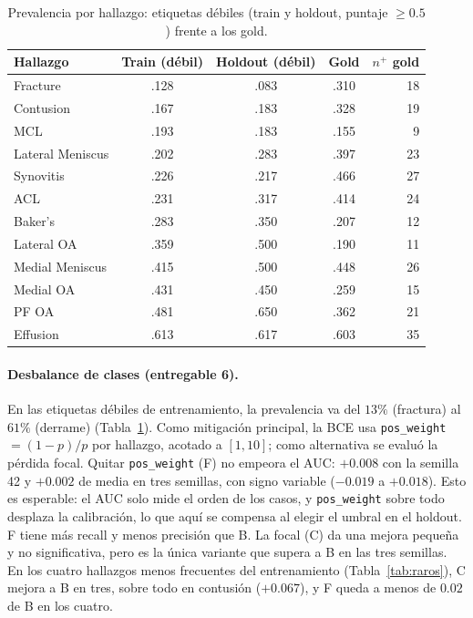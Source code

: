\begin{table}[t]
  \caption{Prevalencia por hallazgo: etiquetas débiles (train y holdout, puntaje $\geq 0.5$) frente a los gold.}
  \label{tab:prevalencia}
  \centering
  \small
  \begin{tabular}{@{}lcccr@{}}
    \toprule
    Hallazgo & Train (débil) & Holdout (débil) & Gold & $n^{+}$ gold \\
    \midrule
    Fracture         & .128 & .083 & .310 & 18 \\
    Contusion        & .167 & .183 & .328 & 19 \\
    MCL              & .193 & .183 & .155 &  9 \\
    Lateral Meniscus & .202 & .283 & .397 & 23 \\
    Synovitis        & .226 & .217 & .466 & 27 \\
    ACL              & .231 & .317 & .414 & 24 \\
    Baker's          & .283 & .350 & .207 & 12 \\
    Lateral OA       & .359 & .500 & .190 & 11 \\
    Medial Meniscus  & .415 & .500 & .448 & 26 \\
    Medial OA        & .431 & .450 & .259 & 15 \\
    PF OA            & .481 & .650 & .362 & 21 \\
    Effusion         & .613 & .617 & .603 & 35 \\
    \bottomrule
  \end{tabular}
\end{table}

\paragraph{Desbalance de clases (entregable 6).}
En las etiquetas débiles de entrenamiento, la prevalencia va del $13\%$ (fractura) al $61\%$ (derrame) (Tabla~\ref{tab:prevalencia}).
Como mitigación principal, la BCE usa \texttt{pos\_weight} $=(1-p)/p$ por hallazgo, acotado a $[1, 10]$; como alternativa se evaluó la pérdida focal.
Quitar \texttt{pos\_weight} (F) no empeora el AUC: $+0.008$ con la semilla 42 y $+0.002$ de media en tres semillas, con signo variable ($-0.019$ a $+0.018$).
Esto es esperable: el AUC solo mide el orden de los casos, y \texttt{pos\_weight} sobre todo desplaza la calibración, lo que aquí se compensa al elegir el umbral en el holdout.
F tiene más recall y menos precisión que B.
La focal (C) da una mejora pequeña y no significativa, pero es la única variante que supera a B en las tres semillas.
En los cuatro hallazgos menos frecuentes del entrenamiento (Tabla~\ref{tab:raros}), C mejora a B en tres, sobre todo en contusión ($+0.067$), y F queda a menos de $0.02$ de B en los cuatro.

